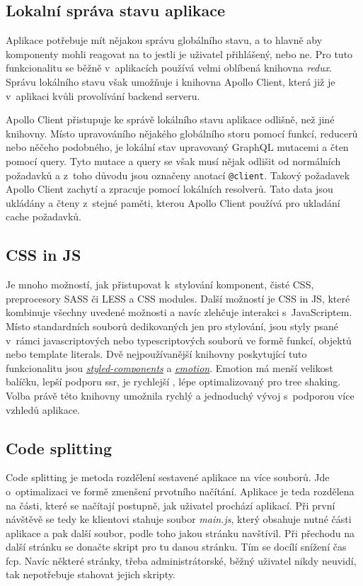 \subsection{Lokalní správa stavu aplikace}
\label{ss:local_state_management}
Aplikace potřebuje mít nějakou správu globálního stavu, a to hlavně aby komponenty mohli reagovat na to jestli je uživatel přihlášený, nebo ne. Pro tuto funkcionalitu se běžně v~aplikacích používá velmi oblíbená knihovna \emph{redux}. Správu lokálního stavu však umožňuje i knihovna Apollo Client, která již je v~aplikaci kvůli provolívání backend serveru.

Apollo Client přistupuje ke správě lokálního stavu aplikace odlišně, než jiné knihovny. Místo upravováního nějakého globálního storu pomocí funkcí, reducerů nebo něčeho podobného, je lokální stav upravovaný GraphQL mutacemi a čten pomocí query. Tyto mutace a query se však musí nějak odlišit od normálních požadavků a z~toho důvodu jsou označeny anotací \texttt{@client}. Takový požadavek Apollo Client zachytí a zpracuje pomocí lokálních resolverů. Tato data jsou ukládány a čteny z~stejné paměti, kterou Apollo Client používá pro ukladání cache požadavků.

\subsection{CSS in JS}
\label{ss:css_in_js}
Je mnoho možností, jak přistupovat k~stylování komponent, čisté CSS, preprocesory SASS či LESS a CSS modules. Další možností je CSS in JS, které kombinuje všechny uvedené možnosti a navíc zlehčuje interakci s~JavaScriptem. Místo standardních souborů dedikovaných jen pro stylování, jsou styly psané v~rámci javascriptových nebo typescriptových souborů ve formě funkcí, objektů nebo template literals. Dvě nejpoužívanější knihovny poskytující tuto funkcionalitu jsou \href{https://styled-components.com/}{\emph{styled-components}} a \href{https://emotion.sh/}{\emph{emotion}}. Emotion má menší velikost balíčku, lepší podporu \acrshort{ssr}, je rychlejší \cite{shehet_2020_css}, lépe optimalizovaný pro \gls{tree shaking}. Volba právě této knihovny umožnila rychlý a jednoduchý vývoj s~podporou více vzhledů aplikace.

\subsection{Code splitting}
\label{ss:code_splitting}
Code splitting je metoda rozdělení sestavené aplikace na více souborů. Jde o~optimalizaci ve formě zmenšení prvotního načítání. Aplikace je teda rozdělena na části, které se načítají postupně, jak uživatel prochází aplikací. Při první návštěvě se tedy ke klientovi stahuje soubor \emph{main.js}, který obsahuje nutné části aplikace a pak další soubor, podle toho jakou stránku navštívil. Při přechodu na další stránku se donačte skript pro tu danou stránku. Tím se docílí snížení čas \acrshort{fcp}. Navíc některé stránky, třeba administrátorské, běžný uživatel nikdy neuvidí, tak nepotřebuje stahovat jejich skripty.

